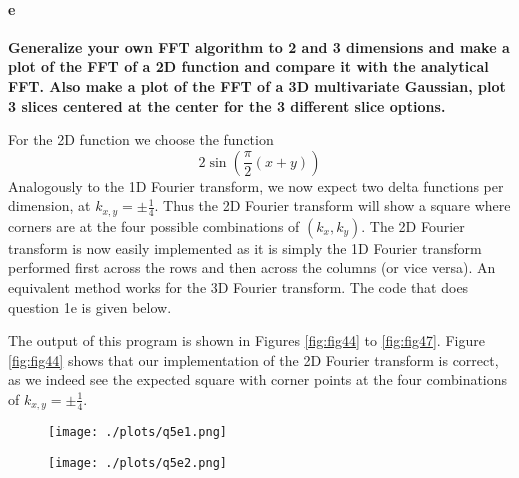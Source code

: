 \paragraph{e} \textbf{Generalize your own FFT algorithm to 2 and 3 dimensions and make a plot of the FFT of a 2D function and compare it with the analytical FFT. Also make a plot of the FFT of a 3D multivariate Gaussian, plot 3 slices centered at the center for the 3 different slice options.}


For the 2D function we choose the function
\begin{equation}\label{eq:2Dsin}
2\sin\left(\frac{\pi}{2}(x+y)\right)
\end{equation}
Analogously to the 1D Fourier transform, we now expect two delta functions per dimension, at $k_{x,y} = \pm \frac{1}{4}$. Thus the 2D Fourier transform will show a square where corners are at the four possible combinations of $(k_{x},k_y)$. The 2D Fourier transform is now easily implemented as it is simply the 1D Fourier transform performed first across the rows and then across the columns (or vice versa). An equivalent method works for the 3D Fourier transform. The code that does question 1e is given below.



The output of this program is shown in Figures \ref{fig:fig44} to \ref{fig:fig47}. Figure \ref{fig:fig44} shows that our implementation of the 2D Fourier transform is correct, as we indeed see the expected square with corner points at the four combinations of $k_{x,y} = \pm \frac{1}{4}$.

\begin{figure}[ht]\centering
\begin{minipage}[t]{.5\textwidth}
\centering
\texttt{[image: ./plots/q5e1.png]}
\captionsetup{width=0.8\linewidth}
\label{fig:fig44}
\end{minipage}%
\begin{minipage}[t]{.5\textwidth}
\centering
\texttt{[image: ./plots/q5e2.png]}
\captionsetup{width=0.8\linewidth}
\label{fig:fig45}
\end{minipage}%
\end{figure}

